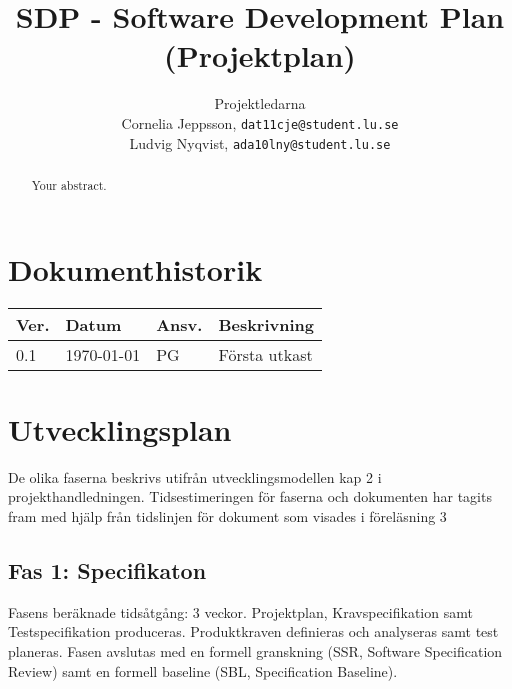﻿\documentclass[a4paper]{article}
\title{SDP - Software Development Plan (Projektplan)}
\author{Projektledarna\\Cornelia Jeppsson, \texttt{dat11cje@student.lu.se}\\
Ludvig Nyqvist, \texttt{ada10lny@student.lu.se}}
\begin{document}
\maketitle
\thispagestyle{fancy}

\begin{abstract}
Your abstract.
\end{abstract}



\tableofcontents
\newpage

\section*{Dokumenthistorik}
\begin{tabular}{ l l l l }
Ver. & Datum & Ansv. & Beskrivning \\\hline
0.1 & \today & PG & Första utkast
\end{tabular}


\section{Utvecklingsplan}

De olika faserna beskrivs utifrån utvecklingsmodellen kap 2 i projekthandledningen\cite{projekthandledning}. Tidsestimeringen för faserna och dokumenten har tagits fram med hjälp från tidslinjen för dokument som visades i föreläsning 3\cite{dokumenttidslinje}
\begin{comment}

En utvecklingsplan som anger fasernas tidsbehov och händelser av betydelse (granskningar och baselines). I utvecklingsplanen beskrivs också eventuell anpassning av utvecklingsmodellen samt dokument till projektet (eng. tailoring)

Det ska finnas referenser till utvecklingsmodellen kap 2 i boken och beskrivning av eventuella anpassningar.
\end{comment}

\subsection{Fas 1: Specifikaton}
Fasens beräknade tidsåtgång: 3 veckor.\newline
Projektplan, Kravspecifikation samt Testspecifikation produceras. Produktkraven definieras och analyseras samt test planeras. Fasen avslutas med en formell granskning (SSR, Software Specification Review) samt en formell baseline (SBL, Specification Baseline).
\end{document}
